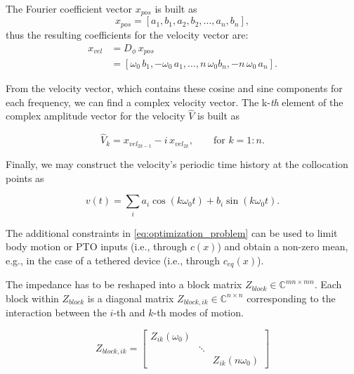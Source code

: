 \documentclass[]{article}
\begin{document}
The Fourier coefficient vector $x_{pos}$ is built as
\begin{equation}
	x_{pos} = [a_1, b_1, a_2, b_2, \ldots, a_n, b_n],
\end{equation}
thus the resulting coefficients for the velocity vector are:
\begin{equation}
	\begin{aligned}
		x_{vel} &= D_{\phi} \, x_{pos}\\
		&= [\omega_0 \, b_1, -\omega_0 \, a_1, \ldots, n \, \omega_0 b_n, -n \, \omega_0 \, a_n].
	\end{aligned}
\end{equation}

\noindent{}From the velocity vector, which contains these cosine and sine components for each frequency, we can find a complex velocity vector.
The k-\textit{th} element of the complex amplitude vector for the velocity $\hat{V}$ is built as

\begin{equation}\label{eq:ps_to_ca}
	\hat{V}_k = x_{vel_{2k-1}} - i \, x_{vel_{2k}}, \qquad \textrm{for } k=1:n.
\end{equation}

\noindent{}Finally, we may construct the velocity's periodic time history at the collocation points as

\begin{equation}
	v(t) = \sum\limits_i a_i \cos \left( k \omega_0 t \right) + b_i \sin \left( k \omega_0 t \right) .
\end{equation}


The additional constraints in \eqref{eq:optimization_problem} can be used to limit body motion or PTO inputs (i.e., through $c(x)$) and obtain a non-zero mean, e.g., in the case of a tethered device (i.e., through $c_{eq}(x)$).


The impedance has to be reshaped into a block matrix $Z_{block} \in \mathbb{C}^{mn \times mn}$.
Each block within $Z_{block}$ is a diagonal matrix $Z_{block,ik} \in \mathbb{C}^{n \times n}$ corresponding to the interaction between the $i$-th and $k$-th modes of motion.

\begin{equation}
	Z_{block,ik} =
	\begin{bmatrix}
		Z_{ik}(\omega_0) & & \\
		& \ddots & \\
		& &  Z_{ik}(n \omega_0)
	\end{bmatrix}
\end{equation}
\end{document}
